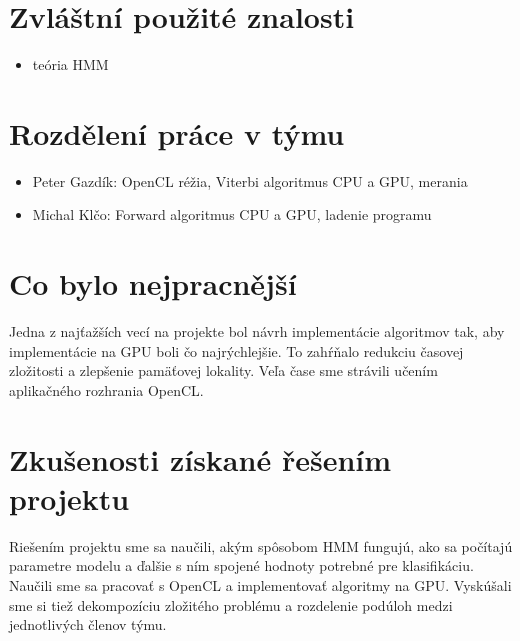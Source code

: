 \documentclass[11pt,a4paper]{article}
\begin{document}

\section{Zvláštní použité znalosti}
\begin{itemize}
\item teória HMM
\end{itemize}


\section{Rozdělení práce v týmu}

\begin{itemize}
\item Peter Gazdík: OpenCL réžia, Viterbi algoritmus CPU a GPU, merania
\item Michal Klčo: Forward algoritmus CPU a GPU, ladenie programu
\end{itemize}


\section{Co bylo nejpracnější}
Jedna z najťažších vecí na projekte bol návrh implementácie algoritmov tak, aby implementácie na GPU boli čo najrýchlejšie. To zahŕňalo redukciu časovej zložitosti a zlepšenie pamäťovej lokality. Veľa čase sme strávili učením aplikačného rozhrania OpenCL.


\section{Zkušenosti získané řešením projektu}
Riešením projektu sme sa naučili, akým spôsobom HMM fungujú, ako sa počítajú parametre modelu a ďalšie s ním spojené hodnoty potrebné pre klasifikáciu. Naučili sme sa pracovať s OpenCL a implementovať algoritmy na GPU. Vyskúšali sme si tiež dekompozíciu zložitého problému a rozdelenie podúloh medzi jednotlivých členov týmu.
\end{document}
